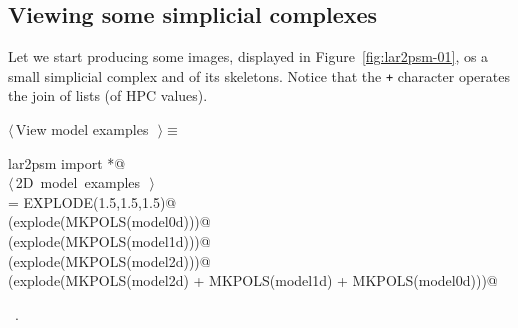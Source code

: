 \documentclass[11pt,oneside]{article}	%
\begin{document}
\subsection{Viewing some simplicial complexes}
Let we start producing some images, displayed in Figure~\ref{fig:lar2psm-01}, os a small simplicial complex and of its skeletons. Notice that the \texttt{+} character operates the join of lists (of HPC values).

\begin{flushleft} \small
\begin{minipage}{\linewidth} \label{scrap20}
$\langle\,$View model examples\nobreak\ {\footnotesize {}}$\,\rangle\equiv$
\vspace{-1ex}
\begin{list}{}{} \item
\mbox{}\verb@from lar2psm import *@\\
\mbox{}\verb@@\hbox{$\langle\,$2D model examples\nobreak\ {\footnotesize {}}$\,\rangle$}\verb@@\\
\mbox{}\verb@explode = EXPLODE(1.5,1.5,1.5)@\\
\mbox{}\verb@VIEW(explode(MKPOLS(model0d)))@\\
\mbox{}\verb@VIEW(explode(MKPOLS(model1d)))@\\
\mbox{}\verb@VIEW(explode(MKPOLS(model2d)))@\\
\mbox{}\verb@VIEW(explode(MKPOLS(model2d) + MKPOLS(model1d) + MKPOLS(model0d)))@\\
\mbox{}\verb@@{\NWsep}
\end{list}
\vspace{-1ex}
\footnotesize\addtolength{\baselineskip}{-1ex}
\begin{list}{}{\setlength{\itemsep}{-\parsep}\setlength{\itemindent}{-\leftmargin}}
\item \NWtxtMacroRefIn\ .
\end{list}
\end{minipage}\\[4ex]
\end{flushleft}
\end{document}
